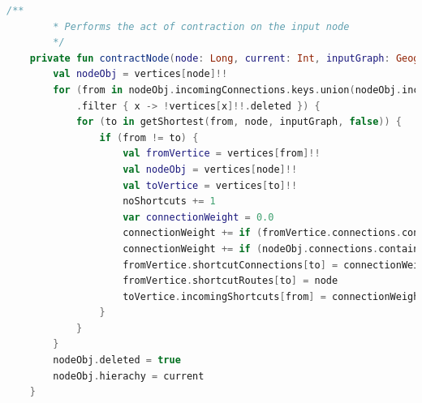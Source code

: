 \documentclass[11pt,twoside,a4paper]{report}
\begin{document}
\begin{lstlisting}[language=kotlin]
    /**
        * Performs the act of contraction on the input node
        */
    private fun contractNode(node: Long, current: Int, inputGraph: GeographicGraph) {
        val nodeObj = vertices[node]!!
        for (from in nodeObj.incomingConnections.keys.union(nodeObj.incomingShortcuts.keys)
            .filter { x -> !vertices[x]!!.deleted }) {
            for (to in getShortest(from, node, inputGraph, false)) {
                if (from != to) {
                    val fromVertice = vertices[from]!!
                    val nodeObj = vertices[node]!!
                    val toVertice = vertices[to]!!
                    noShortcuts += 1
                    var connectionWeight = 0.0
                    connectionWeight += if (fromVertice.connections.containsKey(node)) fromVertice.connections[node]!! else fromVertice.shortcutConnections[node]!!
                    connectionWeight += if (nodeObj.connections.containsKey(to)) nodeObj.connections[to]!! else nodeObj.shortcutConnections[to]!!
                    fromVertice.shortcutConnections[to] = connectionWeight
                    fromVertice.shortcutRoutes[to] = node
                    toVertice.incomingShortcuts[from] = connectionWeight
                }
            }
        }
        nodeObj.deleted = true
        nodeObj.hierachy = current
    }


\end{lstlisting}
\end{document}
